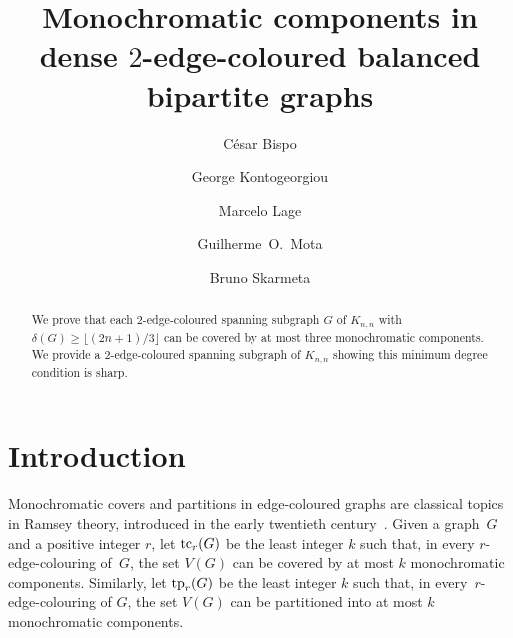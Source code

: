 \documentclass[12pt,reqno,a4paper]{amsart}
\def\tc{\mathop{\text{\rm tc}}\nolimits}
\def\tp{\mathop{\text{\rm tp}}\nolimits}
\begin{document}
	\pagestyle{plain}
	\thispagestyle{empty}
	\footskip=30pt
	\shortdate
	\onehalfspacing
	
	
	\title[Monochromatic components in dense $2$-edge-coloured balanced bipartite graphs]%
	{Monochromatic components in dense $2$-edge-coloured balanced bipartite graphs}
	
	\author[C.~Bispo]{César Bispo}
    \author[G.~Kontogeorgiou]{George Kontogeorgiou}
    \author[M.~Lage]{Marcelo Lage}
	\author[G.~O.~Mota]{Guilherme~O.~Mota}
	\address{Instituto de Matem\'atica e Estat\'{\i}stica \\Universidade de 
		S\~ao Paulo, Rua do Mat\~ao 1010\\05508--090~S\~ao Paulo, Brazil}

    
    \author[B.~Skarmeta]{Bruno Skarmeta}
    \address{Centro de Modelamiento Matem\'atico, Beaucheff 851, Santiago, Chile}
  

	
	
	

	
	
	\begin{abstract}
	We prove that each $2$-edge-coloured spanning subgraph $G$ of $K_{n,n}$ with
	$\delta(G)\ge \lfloor (2n+1)/3 \rfloor$ can be covered by at most three
	monochromatic components. We provide a $2$-edge-coloured spanning subgraph of
	$K_{n,n}$ showing this minimum degree condition is sharp.
	\end{abstract} 
     
	
	\maketitle
	\onehalfspacing


\section{Introduction}

Monochromatic covers and partitions in edge-coloured graphs are classical topics
in Ramsey theory, introduced in the early twentieth
century~\cite{ramsey1930problem, erdos1935combinatorial, erdos1947some}. Given a
graph~$G$ and a positive integer $r$, let $\tc_r(G)$ be the least integer $k$
such that, in every $r$-edge-colouring of~$G$, the set $V(G)$ can be covered by
at most $k$ monochromatic components. Similarly, let $\tp_r(G)$ be the least
integer $k$ such that, in every~$r$-edge-colouring of $G$, the set $V(G)$ can be
partitioned into at most $k$ monochromatic components.
\end{document}

